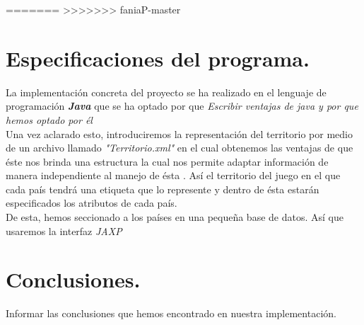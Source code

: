 \documentclass[12pt,twocolumn,draft]{article}
\begin{document}
=======
>>>>>>> faniaP-master

\section{Especificaciones del programa.}

La implementaci\'on concreta del proyecto se ha realizado en el lenguaje de programaci\'on \textbf{\textit{Java}}\cite{JAVA} que se ha optado por que \textit{Escribir ventajas de java y por que hemos optado por \'el}\\

Una vez aclarado esto, introduciremos la representaci\'on del territorio por medio de un archivo llamado \textit{"Territorio.xml"} en el cual obtenemos las ventajas de que \'este nos brinda una estructura la cual nos permite adaptar informaci\'on de manera independiente al manejo de \'esta \cite{xml}. As\'i el territorio del juego en el que cada pa\'is tendr\'a una etiqueta que lo represente y dentro de \'esta estar\'an especificados los atributos de cada pa\'is.\\

De esta, hemos seccionado a los pa\'ises en una peque\~na base de datos. As\'i que usaremos la interfaz \textit{JAXP}\cite{JAXP}

\section{Conclusiones.}
Informar las conclusiones que hemos encontrado en nuestra implementaci\'on.\\


\newpage
	
{}
\end{document}
